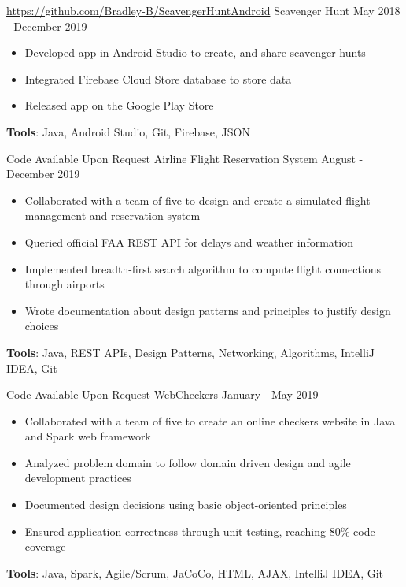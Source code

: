 \documentclass{awesome-cv}
\begin{document}
		\begin{cventries}
			\cventry
				{\href{https://github.com/Bradley-B/ScavengerHuntAndroid}{https://github.com/Bradley-B/ScavengerHuntAndroid}}
				{Scavenger Hunt\small{\textnormal{\color{graytext}{, Personal Project}}}}
				{May 2018 - December 2019}
				{}
				{
					\vspace{-0.25cm}
					\begin{itemize}[nosep]
						\item Developed app in Android Studio to create, and share scavenger hunts
						\item Integrated Firebase Cloud Store database to store data   
						\item Released app on the Google Play Store
					\end{itemize}
					\vspace{0.2cm}
					\qquad \textbf{Tools}: Java, Android Studio, Git, Firebase, JSON
				}

			\cventry
				{Code Available Upon Request}
				{Airline Flight Reservation System\small{\textnormal{\color{graytext}{, Engineering of Software Subsystems}}}}
				{August - December 2019}
				{}
				{
					\vspace{-0.25cm}
					\begin{itemize}[nosep]
						\item Collaborated with a team of five to design and create a simulated flight management and reservation system
						\item Queried official FAA REST API for delays and weather information
						\item Implemented breadth-first search algorithm to compute flight connections through airports
						\item Wrote documentation about design patterns and principles to justify design choices
					\end{itemize}
					\vspace{0.2cm}
					\qquad \textbf{Tools}: Java, REST APIs, Design Patterns, Networking, Algorithms, IntelliJ IDEA, Git
				}

			\cventry
				{Code Available Upon Request}
				{WebCheckers\small{\textnormal{\color{graytext}{, Introduction to Software Engineering}}}}
				{January - May 2019}
				{}
				{
					\vspace{-0.25cm}
					\begin{itemize}[nosep]
						\item Collaborated with a team of five to create an online checkers website in Java and Spark web framework
						\item Analyzed problem domain to follow domain driven design  and agile development practices
						\item Documented design decisions using basic object-oriented principles
						\item Ensured application correctness through unit testing, reaching 80\% code coverage
					\end{itemize}
					\vspace{0.2cm}
					\qquad \textbf{Tools}: Java, Spark, Agile/Scrum, JaCoCo, HTML, AJAX, IntelliJ IDEA, Git
				}


\end{cventries}
\end{document}
